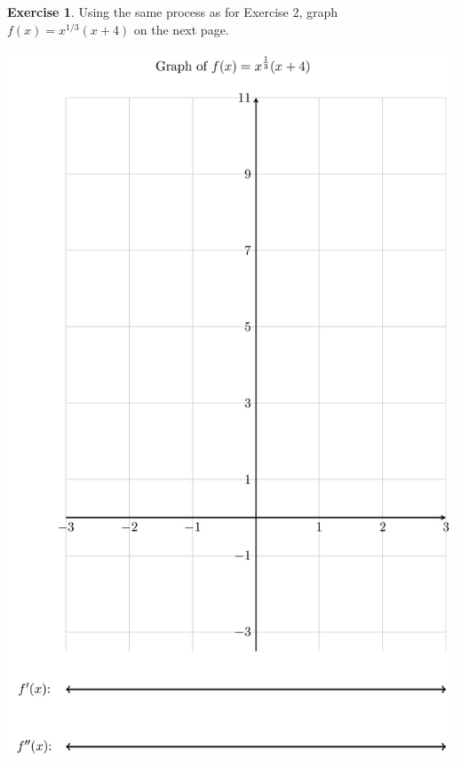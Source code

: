 \documentclass[11pt,reqno,final]{amsart}
\numberwithin{figure}{section}
\theoremstyle{definition} %
\newtheorem{exercise}[question]{Exercise}
\begin{document}
\newpage

\begin{exercise}
        Using the same process as for Exercise 2, graph $f(x) = x^{1/3}(x+4)$ on the next page.
        \newpage
        \begin{center}
                \includegraphics[width=.8\textwidth]{12-07P3.png} \qquad \qquad
        \end{center}
\end{exercise}
\end{document}
